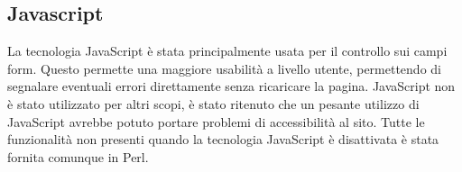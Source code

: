 \subsection{Javascript}
La tecnologia JavaScript \`e stata principalmente usata per il controllo sui campi form. Questo permette una maggiore usabilit\`a a livello utente, permettendo di segnalare eventuali errori direttamente senza ricaricare la pagina.
JavaScript non \`e stato utilizzato per altri scopi, \`e stato ritenuto che un pesante utilizzo di JavaScript avrebbe potuto portare problemi di accessibilit\`a al sito. Tutte le funzionalit\`a non presenti quando la tecnologia JavaScript \`e disattivata \`e stata fornita comunque in Perl.
